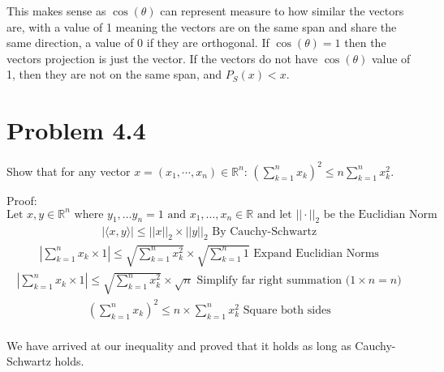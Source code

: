 \documentclass[12pt,twoside]{article}
\begin{document}
This makes sense as $\cos(\theta)$ can represent measure to how similar the vectors are, with a value of 1 meaning the vectors are on the same span and share the same direction, a value of 0 if they are orthogonal. If $\cos(\theta)=1$ then the vectors projection is just the vector. If the vectors do not have $\cos(\theta)$ value of 1, then they are not on the same span, and $P_S(x) < x$.

\section{Problem 4.4}
Show that for any vector 
$x = (x_1, \cdots, x_n) \in \mathbb{R}^n$: $ \left(\sum_{k=1}^n x_k \right)^2 \leq n \sum_{k = 1}^n x_k^2$.

Proof:
$$
    \text{Let } x,y \in \mathbb{R}^n \text{ where } y_1,\dots y_n = 1 \text{ and } x_1, \dots, x_n \in \mathbb{R} \text{ and let } ||\cdot ||_2 \text{ be the Euclidian Norm}
$$
\begin{equation}
    \begin{split}
        |\langle x,y \rangle| \leq ||x||_2\times ||y||_2 \text{ By Cauchy-Schwartz }
    \end{split} 
\end{equation}
\begin{equation}
    \begin{split}
        | \sum_{k=1}^n x_k \times 1 |\leq \sqrt{\sum_{k=1}^n x_k^2} \times \sqrt{\sum_{k=1}^n 1} \text{ Expand Euclidian Norms }
    \end{split} 
\end{equation}
\begin{equation}
    \begin{split}
         | \sum_{k=1}^n x_k \times 1 |\leq \sqrt{\sum_{k=1}^n x_k^2} \times \sqrt{n} \text{ Simplify far right summation $(1 \times n = n$) }
    \end{split} 
\end{equation}
\begin{equation}
    \begin{split}
         (\sum_{k=1}^n x_k)^2 \leq {n} \times  \sum_{k=1}^n x_k^2 \text{ Square both sides }
    \end{split} 
\end{equation}
\\
We have arrived at our inequality and proved that it holds as long as Cauchy-Schwartz holds.
\end{document}
